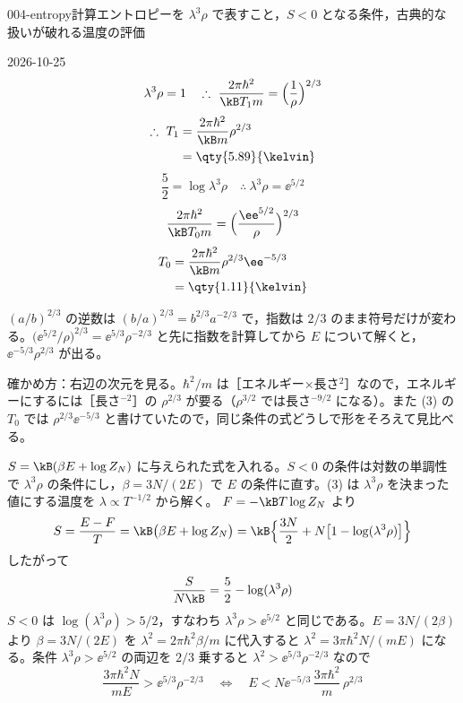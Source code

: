 \documentclass[uplatex,dvipdfmx,a4paper,11pt]{jsarticle}
\begin{document}
\begin{mondai}{004-entropy}{計算}{エントロピーを $\lambda^{3}\rho$ で表すこと，$S<0$ となる条件，古典的な扱いが破れる温度の評価}
\begin{kotaeutsushi}{2026-10-25}
\[ \lambda^{3}\rho=1\quad\therefore\ \frac{2\pi\hbar^{2}}{\kB T_1m}=\Bigl(\frac{1}{\rho}\Bigr)^{2/3} \]
\begin{align*}
\therefore\ T_1&=\frac{2\pi\hbar^{2}}{\kB m}\rho^{2/3}\\
&=\qty{5.89}{\kelvin}
\end{align*}
\[ \frac{5}{2}=\log\lambda^{3}\rho\quad\therefore\ \lambda^{3}\rho=\ee^{5/2} \]
\[ \frac{2\pi\hbar^{2}}{\kB T_0m}=\Bigl(\frac{\ee^{5/2}}{\rho}\Bigr)^{2/3} \]
\begin{align*}
T_0&=\frac{2\pi\hbar^{2}}{\kB m}\rho^{2/3}\ee^{-5/3}\\
&=\qty{1.11}{\kelvin}
\end{align*}
\end{kotaeutsushi}
\begin{kizuki}
\item $(a/b)^{2/3}$ の逆数は $(b/a)^{2/3}=b^{2/3}a^{-2/3}$ で，指数は $2/3$ のまま符号だけが変わる。$\bigl(\ee^{5/2}/\rho\bigr)^{2/3}=\ee^{5/3}\rho^{-2/3}$ と先に指数を計算してから $E$ について解くと，$\ee^{-5/3}\rho^{2/3}$ が出る。
\item 確かめ方：右辺の次元を見る。$\hbar^{2}/m$ は［エネルギー×長さ$^{2}$］なので，エネルギーにするには［長さ$^{-2}$］の $\rho^{2/3}$ が要る（$\rho^{3/2}$ では長さ$^{-9/2}$ になる）。また (3) の $T_0$ では $\rho^{2/3}\ee^{-5/3}$ と書けていたので，同じ条件の式どうしで形をそろえて見比べる。
\end{kizuki}
\begin{tadashii}
\houshin $S=\kB(\beta E+\log Z_N)$ に与えられた式を入れる。$S<0$ の条件は対数の単調性で $\lambda^{3}\rho$ の条件にし，$\beta=3N/(2E)$ で $E$ の条件に直す。(3) は $\lambda^{3}\rho$ を決まった値にする温度を $\lambda\propto T^{-1/2}$ から解く。
\keisan {} $F=-\kB T\log Z_N$ より
\[ S=\frac{E-F}{T}=\kB\bigl(\beta E+\log Z_N\bigr)=\kB\Bigl\{\frac{3N}{2}+N\bigl[1-\log(\lambda^{3}\rho)\bigr]\Bigr\} \]
したがって
\[ \frac{S}{N\kB}=\frac{5}{2}-\log(\lambda^{3}\rho) \]
 $S<0$ は $\log(\lambda^{3}\rho)>5/2$，すなわち $\lambda^{3}\rho>\ee^{5/2}$ と同じである。$E=3N/(2\beta)$ より $\beta=3N/(2E)$ を $\lambda^{2}=2\pi\hbar^{2}\beta/m$ に代入すると $\lambda^{2}=3\pi\hbar^{2}N/(mE)$ になる。条件 $\lambda^{3}\rho>\ee^{5/2}$ の両辺を $2/3$ 乗すると $\lambda^{2}>\ee^{5/3}\rho^{-2/3}$ なので
\[ \frac{3\pi\hbar^{2}N}{mE}>\ee^{5/3}\rho^{-2/3}\quad\Longleftrightarrow\quad E<N\ee^{-5/3}\,\frac{3\pi\hbar^{2}}{m}\,\rho^{2/3} \]

\end{tadashii}
\end{mondai}
\end{document}
